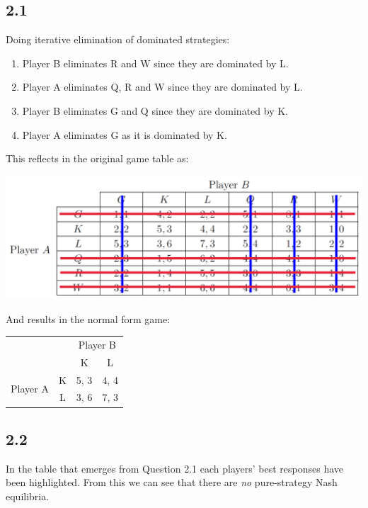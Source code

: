 \documentclass{article}
\begin{document}
\subsection*{2.1} Doing iterative elimination of dominated strategies:
\begin{enumerate}
    \item Player B eliminates R and W since they are dominated by L.
    \item Player A eliminates Q, R and W since they are dominated by L.
    \item Player B eliminates G and Q since they are dominated by K.
    \item Player A eliminates G as it is dominated by K.
\end{enumerate}
This reflects in the original game table as:
\begin{center}
    \includegraphics[width=0.7\linewidth]{iterative-elimination.png}
\end{center}
\newpage
\noindent And results in the normal form game:
\begin{table}[h!]
    \centering
    \begin{tabular}{cccc}
                                                   &                        & \multicolumn{2}{c}{Player B}                          \\ \cline{3-4} 
                                                   & \multicolumn{1}{c|}{}  & \multicolumn{1}{c|}{K}    & \multicolumn{1}{c|}{L}    \\ \cline{2-4} 
    \multicolumn{1}{c|}{\multirow{2}{*}{Player A}} & \multicolumn{1}{c|}{K} & \multicolumn{1}{c|}{{\color{red}5}, 3} & \multicolumn{1}{c|}{4, {\color{blue}4}} \\ \cline{2-4} 
    \multicolumn{1}{c|}{}                          & \multicolumn{1}{c|}{L} & \multicolumn{1}{c|}{3, {\color{blue}6}} & \multicolumn{1}{c|}{{\color{red}7}, 3} \\ \cline{2-4} 
    \end{tabular}
\end{table}

\subsection*{2.2}
In the table that emerges from Question 2.1 each players' best responses have been highlighted. From this we can see that there are \textit{no} pure-strategy Nash equilibria.
\end{document}
